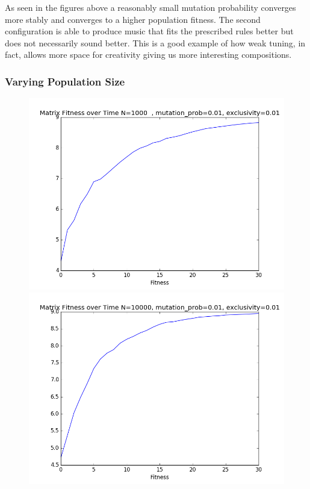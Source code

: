 \documentclass{article}
\begin{document}
As seen in the figures above a reasonably small mutation probability converges more stably and converges to a higher population fitness. The second configuration is able to produce music that fits the prescribed rules better but does not necessarily sound better. This is a good example of how weak tuning, in fact, allows more space for creativity giving us more interesting compositions.

\subsubsection{Varying Population Size}

\begin{figure}[H]
\centering
\begin{minipage}{.5\textwidth}
  \centering
  \includegraphics[width=1\linewidth]{../graphs/population1.png}
\end{minipage}%
\begin{minipage}{.5\textwidth}
  \centering
  \includegraphics[width=1\linewidth]{../graphs/population2.png}
\end{minipage}
\end{figure}
\end{document}
